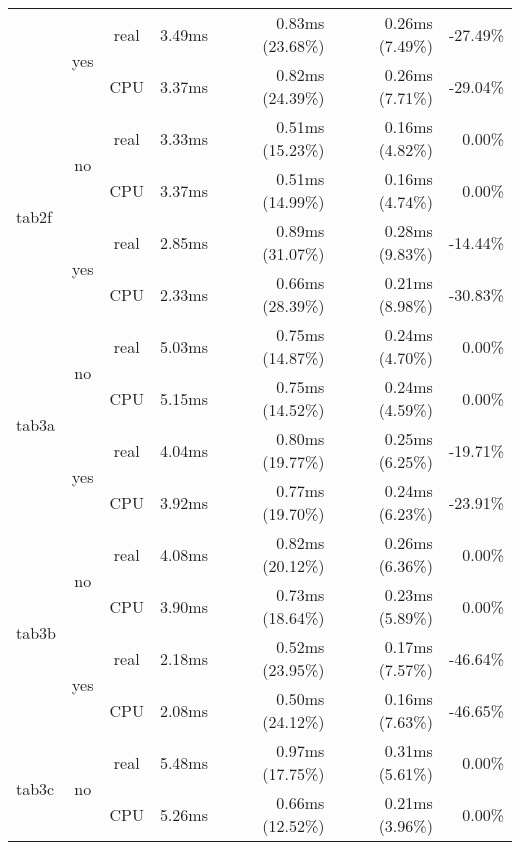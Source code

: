 \documentclass[en]{pracamgr}
\begin{document}
\begin{appendices}
\begin{small}
\begin{longtable}{|l|c|c|r|r|r|r|}
                          \cline{2-7}
                          & \multirow{2}{*}{yes} & real & 3.49ms & 0.83ms (23.68\%) & 0.26ms (7.49\%) & -27.49\% \\*
                          &                      & CPU  & 3.37ms & 0.82ms (24.39\%) & 0.26ms (7.71\%) & -29.04\% \\
\hline
\multirow{4}{*}{tab2f}    & \multirow{2}{*}{no}  & real & 3.33ms & 0.51ms (15.23\%) & 0.16ms (4.82\%) & 0.00\% \\*
                          &                      & CPU  & 3.37ms & 0.51ms (14.99\%) & 0.16ms (4.74\%) & 0.00\% \\*
                          \cline{2-7}
                          & \multirow{2}{*}{yes} & real & 2.85ms & 0.89ms (31.07\%) & 0.28ms (9.83\%) & -14.44\% \\*
                          &                      & CPU  & 2.33ms & 0.66ms (28.39\%) & 0.21ms (8.98\%) & -30.83\% \\
\hline
\multirow{4}{*}{tab3a}    & \multirow{2}{*}{no}  & real & 5.03ms & 0.75ms (14.87\%) & 0.24ms (4.70\%) & 0.00\% \\*
                          &                      & CPU  & 5.15ms & 0.75ms (14.52\%) & 0.24ms (4.59\%) & 0.00\% \\*
                          \cline{2-7}
                          & \multirow{2}{*}{yes} & real & 4.04ms & 0.80ms (19.77\%) & 0.25ms (6.25\%) & -19.71\% \\*
                          &                      & CPU  & 3.92ms & 0.77ms (19.70\%) & 0.24ms (6.23\%) & -23.91\% \\
\hline
\multirow{4}{*}{tab3b}    & \multirow{2}{*}{no}  & real & 4.08ms & 0.82ms (20.12\%) & 0.26ms (6.36\%) & 0.00\% \\*
                          &                      & CPU  & 3.90ms & 0.73ms (18.64\%) & 0.23ms (5.89\%) & 0.00\% \\*
                          \cline{2-7}
                          & \multirow{2}{*}{yes} & real & 2.18ms & 0.52ms (23.95\%) & 0.17ms (7.57\%) & -46.64\% \\*
                          &                      & CPU  & 2.08ms & 0.50ms (24.12\%) & 0.16ms (7.63\%) & -46.65\% \\
\hline
\multirow{4}{*}{tab3c}    & \multirow{2}{*}{no}  & real & 5.48ms & 0.97ms (17.75\%) & 0.31ms (5.61\%) & 0.00\% \\*
                          &                      & CPU  & 5.26ms & 0.66ms (12.52\%) & 0.21ms (3.96\%) & 0.00\% \\*

\end{longtable}
\end{small}
\end{appendices}
\end{document}
